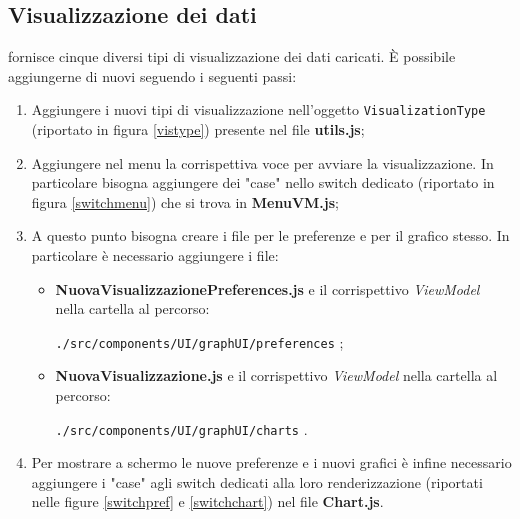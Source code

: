 \subsection{Visualizzazione dei dati}
\NomeProgetto{} fornisce cinque diversi tipi di visualizzazione dei dati caricati. È possibile aggiungerne di nuovi seguendo i seguenti passi:
\begin{enumerate}[label=\textbf{\arabic*})]
	\item Aggiungere i nuovi tipi di visualizzazione nell'oggetto \texttt{VisualizationType} (riportato in figura \ref{vistype}) presente nel file \textbf{utils.js};
	\item Aggiungere nel menu la corrispettiva voce per avviare la visualizzazione. In particolare bisogna aggiungere dei "case" nello switch dedicato (riportato in figura \ref{switchmenu}) che si trova in \textbf{MenuVM.js};
	\item A questo punto bisogna creare i file per le preferenze e per il grafico stesso. In particolare è necessario aggiungere i file:
	\begin{itemize}
		\item \textbf{NuovaVisualizzazionePreferences.js} e il corrispettivo \textit{ViewModel} nella cartella al percorso:
	\begin{center}
		\texttt{./src/components/UI/graphUI/preferences} ;
	\end{center}			
		
		\item \textbf{NuovaVisualizzazione.js} e il corrispettivo \textit{ViewModel} nella cartella al percorso:
	\begin{center}
		\texttt{./src/components/UI/graphUI/charts} .
	\end{center}		
	\end{itemize}		
	\item Per mostrare a schermo le nuove preferenze e i nuovi grafici è infine necessario aggiungere i "case" agli switch dedicati alla loro renderizzazione (riportati nelle figure \ref{switchpref} e \ref{switchchart}) nel file \textbf{Chart.js}.
\end{enumerate}

